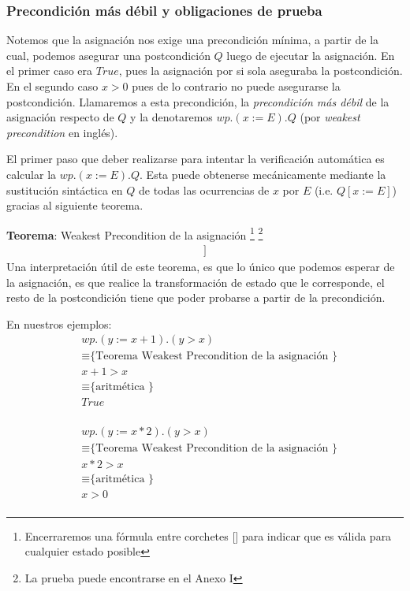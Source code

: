 \documentclass[12pt, a4paper, openany, fleqn]{book}
\begin{document}
    \subsubsection*{Precondición más débil y obligaciones de prueba}
    Notemos que la asignación nos exige una precondición mínima, a partir de la cual, podemos asegurar una postcondición $Q$ luego de ejecutar la asignación. En el primer caso era $True$, pues la asignación por si sola aseguraba la postcondición. En el segundo caso $x > 0$ pues de lo contrario no puede asegurarse la postcondición.
    Llamaremos a esta precondición, la \textit{precondición más débil} de la asignación respecto de $Q$ y la denotaremos $wp.(x := E).Q$ (por \textit{weakest precondition} en inglés).

    El primer paso que deber realizarse para intentar la verificación automática es calcular la $wp.(x := E).Q$.
    Esta puede obtenerse mecánicamente mediante la sustitución sintáctica en $Q$ de todas las ocurrencias de $x$ por $E$ (i.e. $Q[x := E]$) gracias al siguiente teorema.

    \textbf{Teorema}: Weakest Precondition de la asignación
    \footnote{Encerraremos una fórmula entre corchetes [] para indicar que es válida para cualquier estado posible}
    \footnote{La prueba puede encontrarse en el Anexo I}
    \begin{align*}
        [ wp.(x:=E).Q \equiv Q[x:=E] ]
    \end{align*}
    Una interpretación útil de este teorema, es que lo único que podemos esperar de la asignación, es que realice la transformación de estado que le corresponde, el resto de la postcondición tiene que poder probarse a partir de la precondición.

    En nuestros ejemplos:
    \begin{align*}
        & wp.(y := x + 1).( y > x )\\
        & \equiv \text{\{ Teorema Weakest Precondition de la asignación \}}\\
        & x + 1 > x\\
        & \equiv \text{\{ aritmética \}}\\
        & True\\
    \end{align*}

    \begin{align*}
        & wp.(y := x * 2).( y > x )\\
        & \equiv \text{\{ Teorema Weakest Precondition de la asignación \}}\\
        & x * 2 > x\\
        & \equiv \text{\{ aritmética \}}\\
        & x > 0\\
    \end{align*}
\end{document}
